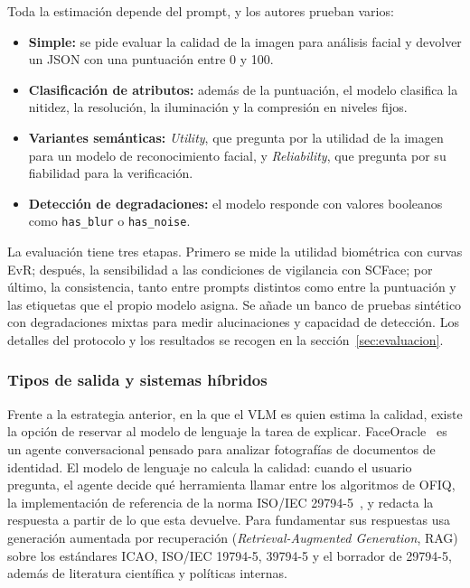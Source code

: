 Toda la estimación depende del prompt, y los autores prueban varios:
\begin{itemize}
\item \textbf{Simple:} se pide evaluar la calidad de la imagen para análisis facial y devolver un JSON con una puntuación entre 0 y 100.
\item \textbf{Clasificación de atributos:} además de la puntuación, el modelo clasifica la nitidez, la resolución, la iluminación y la compresión en niveles fijos.
\item \textbf{Variantes semánticas:} \textit{Utility}, que pregunta por la utilidad de la imagen para un modelo de reconocimiento facial, y \textit{Reliability}, que pregunta por su fiabilidad para la verificación.
\item \textbf{Detección de degradaciones:} el modelo responde con valores booleanos como \texttt{has\_blur} o \texttt{has\_noise}.
\end{itemize}

La evaluación tiene tres etapas. Primero se mide la utilidad biométrica con curvas EvR; después, la sensibilidad a las condiciones de vigilancia con SCFace; por último, la consistencia, tanto entre prompts distintos como entre la puntuación y las etiquetas que el propio modelo asigna. Se añade un banco de pruebas sintético con degradaciones mixtas para medir alucinaciones y capacidad de detección. Los detalles del protocolo y los resultados se recogen en la sección~\ref{sec:evaluacion}.

\subsubsection{Tipos de salida y sistemas híbridos}
\label{sec:hibridos}
Frente a la estrategia anterior, en la que el VLM es quien estima la calidad, existe la opción de reservar al modelo de lenguaje la tarea de explicar. FaceOracle~\cite{Kabbani_2024_ECCVW} es un agente conversacional pensado para analizar fotografías de documentos de identidad. El modelo de lenguaje no calcula la calidad: cuando el usuario pregunta, el agente decide qué herramienta llamar entre los algoritmos de OFIQ, la implementación de referencia de la norma ISO/IEC 29794-5~\cite{ISO_29794_5}, y redacta la respuesta a partir de lo que esta devuelve. Para fundamentar sus respuestas usa generación aumentada por recuperación (\textit{Retrieval-Augmented Generation}, RAG) sobre los estándares ICAO, ISO/IEC 19794-5, 39794-5 y el borrador de 29794-5, además de literatura científica y políticas internas.

